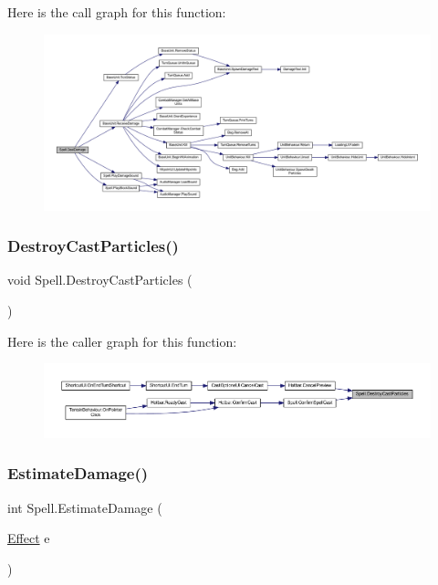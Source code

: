 Here is the call graph for this function\+:
\nopagebreak
\begin{figure}[H]
\begin{center}
\leavevmode
\includegraphics[width=350pt]{class_spell_ad2e4f64f1f7ced4b69c55619d5fdb0b0_cgraph}
\end{center}
\end{figure}
\mbox{\label{class_spell_a46dfa81169863ddb791b3c7d5121fcb8}} 
\subsubsection{\texorpdfstring{DestroyCastParticles()}{DestroyCastParticles()}}
{\footnotesize\ttfamily void Spell.\+Destroy\+Cast\+Particles (\begin{DoxyParamCaption}{ }\end{DoxyParamCaption})}

Here is the caller graph for this function\+:\nopagebreak
\begin{figure}[H]
\begin{center}
\leavevmode
\includegraphics[width=350pt]{class_spell_a46dfa81169863ddb791b3c7d5121fcb8_icgraph}
\end{center}
\end{figure}
\mbox{\label{class_spell_aa5a9b6a6b13fcd1cfed9eb43e123ca23}} 
\subsubsection{\texorpdfstring{EstimateDamage()}{EstimateDamage()}}
{\footnotesize\ttfamily int Spell.\+Estimate\+Damage (\begin{DoxyParamCaption}\item[{\mbox{\hyperlink{class_effect}{Effect}}}]{e }\end{DoxyParamCaption})}

